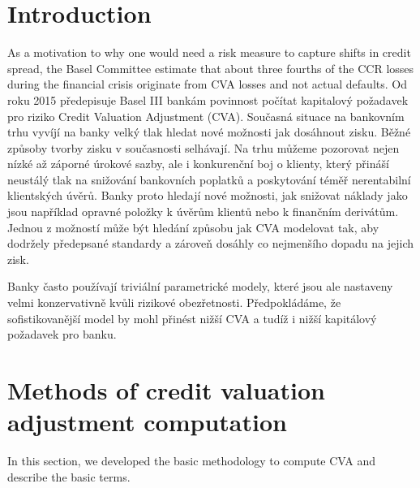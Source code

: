 \documentclass{amsart}
\theoremstyle{definition}\newtheorem{definition}[theorem]{Definition}
\theoremstyle{remark}\newtheorem{remark}[theorem]{Remark}
\begin{document}
\section{Introduction}
As a motivation to why one would need a risk measure to capture shifts in credit spread, the Basel Committee estimate that about three fourths of the CCR losses during the financial crisis originate from CVA losses and not actual defaults.
\hfill
\newline
\newline
Od roku 2015 předepisuje Basel III bankám povinnost počítat kapitalový požadavek pro riziko Credit Valuation Adjustment (CVA).
Současná situace na bankovním trhu vyvíjí na banky velký tlak hledat nové možnosti jak dosáhnout zisku.
Běžné způsoby tvorby zisku v současnosti selhávají.
Na trhu můžeme pozorovat nejen nízké až záporné úrokové sazby, ale i konkurenční boj o klienty, který přináší neustálý tlak na snižování bankovních poplatků a poskytování téměř nerentabilní klientských úvěrů.
Banky proto hledají nové možnosti, jak snižovat náklady jako jsou například opravné položky k úvěrům klientů nebo k finančním derivátům.
Jednou z možností může být hledání způsobu jak CVA modelovat tak, aby dodržely předepsané standardy a zároveň dosáhly co nejmenšího dopadu na jejich zisk. 

Banky často používají triviální parametrické modely, které jsou ale nastaveny velmi konzervativně kvůli rizikové obezřetnosti.
Předpokládáme, že sofistikovanější model by mohl přinést nižší CVA a tudíž i nižší kapitálový požadavek pro banku. 


\section{Methods of credit valuation adjustment computation} 
In this section, we developed the basic methodology to compute CVA and describe the basic terms.
\end{document}
